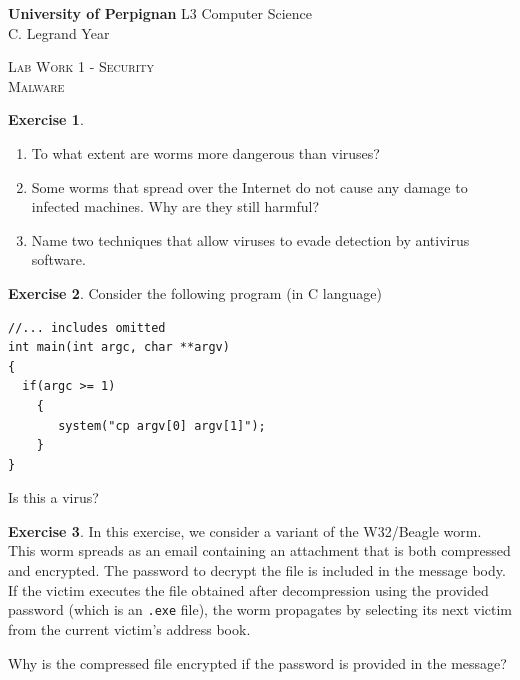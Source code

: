 \documentclass[a4paper,11pt]{article}
\theoremstyle{plain}
\theoremstyle{definition}
\newtheorem{exercice}{Exercise}
\begin{document}
\hbox{}
\noindent \textbf{University of Perpignan} \hfill  L3 Computer Science \\
 \hfill C. Legrand \hfill  Year \the\year \\
\smallskip
\begin{center}
{
  {\scshape \large Lab Work 1 - Security \\ Malware}  \\
}



\end{center}
\hbox{}

\bigskip

\bigskip


\begin{exercice}
\begin{enumerate}
\item To what extent are worms more dangerous than viruses?
\item Some worms that spread over the Internet do not cause any damage to infected machines. Why are they still harmful?
\item Name two techniques that allow viruses to evade detection by antivirus software.
\end{enumerate}
\end{exercice}



\begin{exercice}
Consider the following program (in C language)
\begin{verbatim}
//... includes omitted
int main(int argc, char **argv)
{
  if(argc >= 1)
    {
       system("cp argv[0] argv[1]");
    }
}
\end{verbatim}
Is this a virus?
\end{exercice}


\begin{exercice}
In this exercise, we consider a variant of the W32/Beagle worm. This worm spreads as an email containing an attachment that is both compressed and encrypted. The password to decrypt the file is included in the message body. If the victim executes the file obtained after decompression using the provided password (which is an \texttt{.exe} file), the worm propagates by selecting its next victim from the current victim's address book.

Why is the compressed file encrypted if the password is provided in the message?

\end{exercice}
\end{document}
